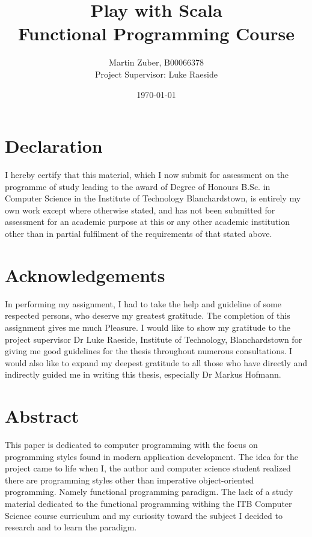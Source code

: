 \documentclass[12pt,twoside,a4paper]{report}
\title{Play with Scala\\Functional Programming Course}
\author{Martin Zuber, B00066378 \\ Project Supervisor:  Luke Raeside}
\date{\today}
\begin{document}
\maketitle
\newpage








\chapter*{Declaration}
I hereby certify that this material, which I now submit for assessment on the programme of study leading to the award of Degree of Honours B.Sc. in Computer Science in the Institute of Technology Blanchardstown, is entirely my own work except where otherwise stated, and has not been submitted for assessment for an academic purpose at this or any other academic institution other than in partial fulfilment of the requirements of that stated above.









\chapter*{Acknowledgements}
In performing my assignment, I had to take the help and guideline of some respected persons, who deserve my greatest gratitude. The completion of this assignment gives me much Pleasure. I would like to show my gratitude to the project supervisor Dr Luke Raeside, Institute of Technology, Blanchardstown for giving me good guidelines for the thesis throughout numerous consultations. I would also like to expand my deepest gratitude to all those who have directly and indirectly guided me in writing this thesis, especially Dr Markus Hofmann.








\chapter*{Abstract}
This paper is dedicated to computer programming with the focus on programming styles found in modern application development. The idea for the project came to life when I, the author and computer science student realized there are programming styles other than imperative object-oriented programming. Namely functional programming paradigm. The lack of a study material dedicated to the functional programming withing the ITB Computer Science course curriculum and my curiosity toward the subject I decided to research and to learn the paradigm.
\end{document}
